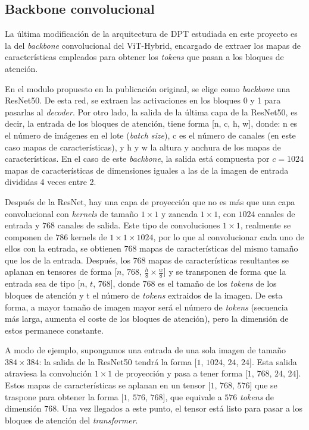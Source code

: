 \subsection{Backbone convolucional}
La última modificación de la arquitectura de DPT estudiada en este proyecto es la del \textit{backbone} convolucional del ViT-Hybrid, encargado de extraer los mapas de características empleados para obtener los \textit{tokens} que pasan a los bloques de atención. 

En el modulo propuesto en la publicación original, se elige como \textit{backbone} una ResNet50. De esta red, se extraen las activaciones en los bloques 0 y 1 para pasarlas al \textit{decoder}. Por otro lado, la salida de la última capa de la ResNet50, es decir, la entrada de los bloques de atención, tiene forma [n, c, h, w], donde: n es el número de imágenes en el lote (\textit{batch size}), c es el número de canales (en este caso mapas de características), y h y w la altura y anchura de los mapas de características. En el caso de este \textit{backbone}, la salida está compuesta por $c=1024$ mapas de características de dimensiones iguales a las de la imagen de entrada divididas 4 veces entre 2.

Después de la ResNet, hay una capa de proyección que no es más que una capa convolucional con \textit{kernels} de tamaño $1\times1$ y zancada $1\times1$, con $1024$ canales de entrada y $768$ canales de salida. Este tipo de convoluciones $1\times1$, realmente se componen de $786$ kernels de $1\times1\times1024$, por lo que al convolucionar cada uno de ellos con la entrada, se obtienen $768$ mapas de características del mismo tamaño que los de la entrada. Después, los $768$ mapas de características resultantes se aplanan en tensores de forma [$n$, $768$, $\frac{h}{8} \times \frac{w}{8}$] y se transponen de forma que la entrada sea de tipo [$n$, $t$, $768$], donde $768$ es el tamaño de los \textit{tokens} de los bloques de atención y t el número de \textit{tokens} extraidos de la imagen. De esta forma, a mayor tamaño de imagen mayor será el número de \textit{tokens} (secuencia más larga, aumenta el coste de los bloques de atención), pero la dimensión de estos permanece constante.

A modo de ejemplo, supongamos una entrada de una sola imagen de tamaño $384\times384$: la salida de la ResNet50 tendrá la forma [$1$, $1024$, $24$, $24$]. Esta salida atraviesa la convolución $1\times1$ de proyección y pasa a tener forma [$1$, $768$, $24$, $24$]. Estos mapas de características se aplanan en un tensor [$1$, $768$, $576$] que se traspone para obtener la forma [$1$, $576$, $768$], que equivale a $576$ \textit{tokens} de dimensión $768$. Una vez llegados a este punto, el tensor está listo para pasar a los bloques de atención del \textit{transformer}.

